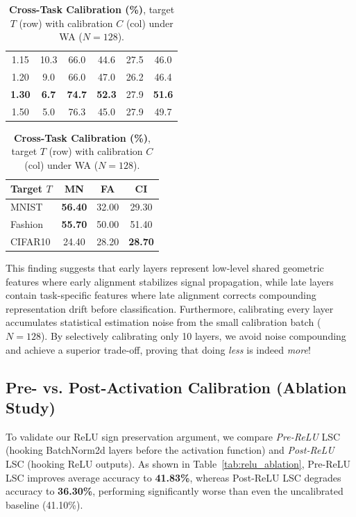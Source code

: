 \documentclass{article}
\theoremstyle{plain}
\theoremstyle{definition}
\theoremstyle{remark}
\begin{document}
\begin{table}[t]
\begin{minipage}{0.34\textwidth}
\begin{center}
\begin{small}
\begin{sc}
\begin{tabular}{cccccc}
1.15 & 10.3 & 66.0 & 44.6 & 27.5 & 46.0 \\
1.20 & 9.0 & 66.0 & 47.0 & 26.2 & 46.4 \\
\textbf{1.30} & \textbf{6.7} & \textbf{74.7} & \textbf{52.3} & 27.9 & \textbf{51.6} \\
1.50 & 5.0 & 76.3 & 45.0 & 27.9 & 49.7 \\
\bottomrule
\end{tabular}
\end{sc}
\end{small}
\end{center}
\end{minipage}
\hfill
\begin{minipage}{0.32\textwidth}
\caption{\textbf{Cross-Task Calibration (\%)}, target $T$ (row) with calibration $C$ (col) under WA ($N=128$).}
\label{tab:cross_task}
\vskip 0.05in
\begin{center}
\begin{small}
\begin{sc}
\setlength{\tabcolsep}{0.5pt}
\begin{tabular}{lccc}
\toprule
Target $T$ & MN & FA & CI \\
\midrule
MNIST & \textbf{56.40} & 32.00 & 29.30 \\
Fashion & \textbf{55.70} & 50.00 & 51.40 \\
CIFAR10 & 24.40 & 28.20 & \textbf{28.70} \\
\bottomrule
\end{tabular}
\end{sc}
\end{small}
\end{center}
\end{minipage}
\vspace{-10pt}
\vskip -0.15in
\end{table}

This finding suggests that early layers represent low-level shared geometric features where early alignment stabilizes signal propagation, while late layers contain task-specific features where late alignment corrects compounding representation drift before classification. Furthermore, calibrating every layer accumulates statistical estimation noise from the small calibration batch ($N=128$). By selectively calibrating only 10 layers, we avoid noise compounding and achieve a superior trade-off, proving that doing \textit{less} is indeed \textit{more}!

\subsection{Pre- vs. Post-Activation Calibration (Ablation Study)}
\label{sec:relu_ablation}
To validate our ReLU sign preservation argument, we compare \textit{Pre-ReLU} LSC (hooking BatchNorm2d layers before the activation function) and \textit{Post-ReLU} LSC (hooking ReLU outputs). As shown in Table~\ref{tab:relu_ablation}, Pre-ReLU LSC improves average accuracy to \textbf{41.83\%}, whereas Post-ReLU LSC degrades accuracy to \textbf{36.30\%}, performing significantly worse than even the uncalibrated baseline (41.10\%). 
\end{document}

